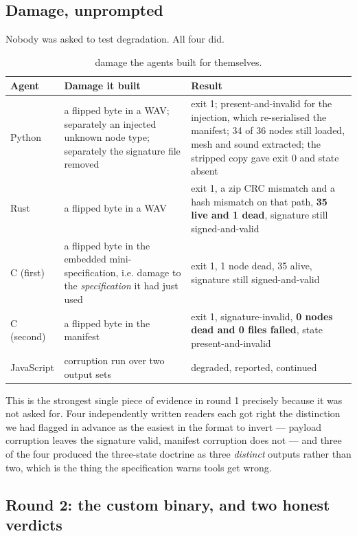 \documentclass[10pt,twocolumn,letterpaper]{article}
\begin{document}
\subsection{Damage, unprompted}

Nobody was asked to test degradation. All four did.

\begin{table}[t]\centering\footnotesize
\caption{damage the agents built for themselves.}
\begin{tabular}{@{}l L{2.7cm} L{4.6cm}@{}}
\toprule
Agent & Damage it built & Result \\
\midrule
Python & a flipped byte in a WAV; separately an injected unknown node type; separately the signature file removed & exit 1; present-and-invalid for the injection, which re-serialised the manifest; 34 of 36 nodes still loaded, mesh and sound extracted; the stripped copy gave exit 0 and state absent \\
Rust & a flipped byte in a WAV & exit 1, a zip CRC mismatch and a hash mismatch on that path, \textbf{35 live and 1 dead}, signature still signed-and-valid \\
C (first) & a flipped byte in the embedded mini-specification, i.e. damage to the \emph{specification} it had just used & exit 1, 1 node dead, 35 alive, signature still signed-and-valid \\
C (second) & a flipped byte in the manifest & exit 1, signature-invalid, \textbf{0 nodes dead and 0 files failed}, state present-and-invalid \\
JavaScript & corruption run over two output sets & degraded, reported, continued \\
\bottomrule
\end{tabular}
\end{table}

This is the strongest single piece of evidence in round 1 precisely because it was not asked for. Four independently written readers each got right the distinction we had flagged in advance as the easiest in the format to invert --- payload corruption leaves the signature valid, manifest corruption does not --- and three of the four produced the three-state doctrine as three \emph{distinct} outputs rather than two, which is the thing the specification warns tools get wrong.

\subsection{Round 2: the custom binary, and two honest verdicts}
\end{document}
